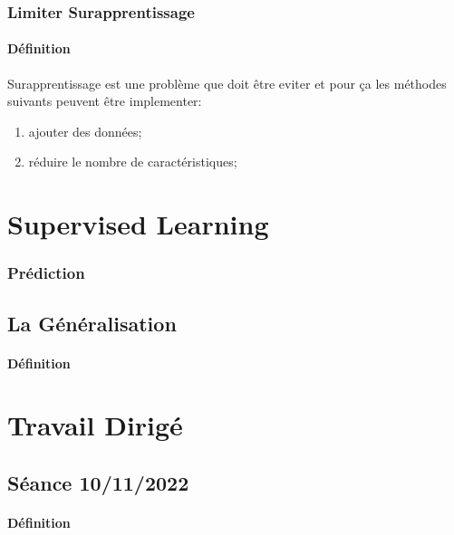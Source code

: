 \documentclass{article}
\begin{document}
\subsubsection{Limiter Surapprentissage}
\paragraph{Définition}Surapprentissage est une problème que doit être eviter et pour ça les méthodes suivants peuvent être implementer:
\begin{enumerate}[noitemsep]
    \item ajouter des données;
    \item réduire le nombre de caractéristiques;
\end{enumerate}



\section{Supervised Learning}

\subsubsection{Prédiction}


\subsection{La Généralisation}
\paragraph{Définition}


\section{Travail Dirigé}
\subsection{Séance 10/11/2022}
\paragraph{Définition}
\end{document}
